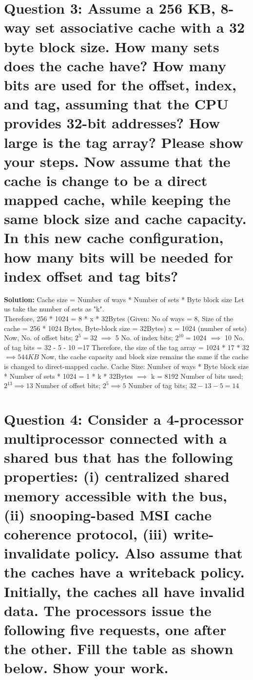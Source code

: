 \documentclass[11pt]{article}
\begin{document}
\section* {Question 3: Assume a 256 KB, 8-way set associative cache with a 32 byte block size. How many sets does the cache have? How many bits are used for the offset, index, and tag, assuming that the CPU provides 32-bit addresses? How large is the tag array? Please show your steps.
Now assume that the cache is change to be a direct mapped cache, while keeping the same block size and cache capacity. In this new cache configuration, how many bits will be needed for index offset and tag bits? 
}
\newline
\textbf{Solution:  } Cache size = Number of ways * Number of sets * Byte block size
\newline 
Let us take the number of sets as "k". \\
Therefore, 256 * 1024 = 8 * x * 32Bytes (Given: No of ways  = 8, Size of the cache = 256 * 1024 Bytes, Byte-block size = 32Bytes)
\newline 
x = 1024 (number of sets) \\
Now, No. of offset bits; $2^5 = 32$ $\implies$ 5
\newline 
No. of index bits; $2^{10} = 1024$ $\implies$ 10 \newline
No. of tag bits = 32 - 5 - 10 =17 
\newline 
Therefore, the size of the tag array = 1024 * 17 * 32
$\implies 544KB$
\newline 
\newline 
Now, the cache capacity and block size remains the same if the cache is changed to direct-mapped cache.
\newline 
Cache Size: Number of ways * Byte block size * Number of sets 
 * 1024 = 1 * k * 32Bytes
\newline 
$\implies$ k = 8192
\newline 
Number of bits used; $2^{13} \implies 13$
\newline 
Number of offset bits; $2^{5} \implies 5$
\newline 
Number of tag bits; $32 - 13 - 5 = 14$

\newline 
\section* {Question 4: Consider a 4-processor multiprocessor connected with a shared bus that has the following properties: (i) centralized shared memory accessible with the bus, (ii) snooping-based MSI cache coherence protocol, (iii) write-invalidate policy. Also assume that the caches have a writeback policy. Initially, the caches all have invalid data. The processors issue the following five requests, one after the other. Fill the table as shown below. Show your work.
}
\end{document}
